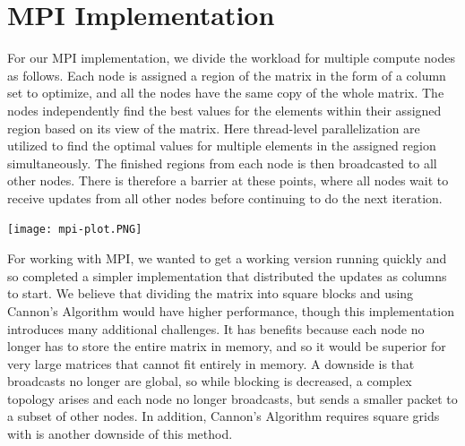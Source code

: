 \documentclass{article}
\begin{document}
\section{MPI Implementation}
For our MPI implementation, we divide the workload for multiple compute nodes as follows. Each node is assigned a region of the matrix in the form of a column set to optimize, and all the nodes have the same copy of the whole matrix. The nodes independently find the best values for the elements within their assigned region based on its view of the matrix. Here thread-level parallelization are utilized to find the optimal values for multiple elements in the assigned region simultaneously. The finished regions from each node is then broadcasted to all other nodes. There is therefore a barrier at these points, where all nodes wait to receive updates from all other nodes before continuing to do the next iteration. 

\texttt{[image: mpi-plot.PNG]}

For working with MPI, we wanted to get a working version running quickly and so completed a simpler implementation that distributed the updates as columns to start. We believe that dividing the matrix into square blocks and using Cannon's Algorithm would have higher performance, though this implementation introduces many additional challenges. It has benefits because each node no longer has to store the entire matrix in memory, and so it would be superior for very large matrices that cannot fit entirely in memory. A downside is that broadcasts no longer are global, so while blocking is decreased,  a complex topology arises and each node no longer broadcasts, but sends a smaller packet to a subset of other nodes. In addition, Cannon's Algorithm requires square grids with is another downside of this method.
\end{document}
